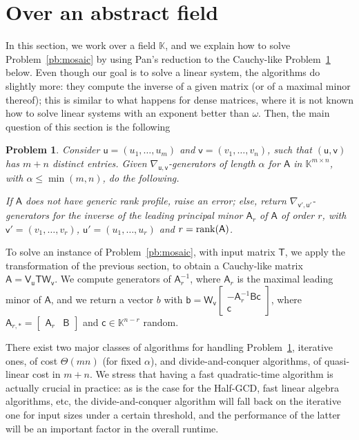 \documentclass[sigconf]{acmart}
\newcommand{\vb}{\ensuremath{\mathsf{b}}}
\newcommand{\vc}{\ensuremath{\mathsf{c}}}
\newcommand{\vu}{\ensuremath{\mathsf{u}}}
\newcommand{\vv}{\ensuremath{\mathsf{v}}}
\newcommand{\mA}{\ensuremath{\mathsf{A}}}
\newcommand{\mB}{\ensuremath{\mathsf{B}}}
\newcommand{\mT}{\ensuremath{\mathsf{T}}}
\newcommand{\mV}{\ensuremath{\mathsf{V}}}
\newcommand{\mW}{\ensuremath{\mathsf{W}}}
\newcommand{\K}{\ensuremath{\mathbb{K}}}
\newtheorem{pbm}{Problem}
\theoremstyle{acmdefinition}
\begin{document}
\section{Over an abstract field}\label{sec:abstract}
%
In this section, we work over a field $\K$, and we explain how to
solve Problem~\ref{pb:mosaic} by using Pan's reduction to the
Cauchy-like Problem~\ref{pb:cauchy} below. Even though our goal is to
solve a linear system, the algorithms do slightly more: they compute
the inverse of a given matrix (or of a maximal minor thereof); this is
similar to what happens for dense matrices, where it is not known how
to solve linear systems with an exponent better than $\omega$.
Then, the main question of this section is the following 
%
%

\vspace{-10px}
\begin{pbm}\label{pb:cauchy}
  Consider $\vu=(u_1,\dots,u_m)$ and $\vv=(v_1,\dots,v_n)$,
  such that $(\vu,\vv)$ has $m+n$ distinct entries. Given
  $\nabla_{\vu,\vv}$-generators of length $\alpha$ for $\mA$
  in $\K^{m \times n}$, with $\alpha \le \min(m,n)$, do the following.

  If $\mA$ does not have generic rank profile, raise an error;
  else, return $\nabla_{\vv',\vu'}$-generators for the inverse
    of the leading principal minor $\mA_r$ of $\mA$ of order $r$, with
    $\vv'=(v_1,\dots,v_r)$, $\vu'=(u_1,\dots,u_r)$ and
    $r={\rm rank}(\mA)$.
\end{pbm}

\vspace{-10px}
To solve an instance of Problem~\ref{pb:mosaic}, with input matrix
$\mT$, we apply the transformation of the previous section, to obtain
a Cauchy-like matrix $\mA = \mV_\vu \mT \mW_{\vv}$. We compute
generators of $\mA_{r}^{-1}$, where $\mA_r$ is the maximal leading minor
of $\mA$, and we return a vector $b$ with
$\vb=\mW_{\vv}
\left[\begin{smallmatrix} 
-\mA_r^{-1}  \mB \vc \\ 
\vc
\end{smallmatrix}\right]$,
where 
%
$\mA_{r,\ast}=\begin{bmatrix}
    \mA_r & \mB
  \end{bmatrix}$ 
and $\vc \in \K^{n-r}$ random.

There exist two major classes of algorithms for handling
Problem~\ref{pb:cauchy}, iterative ones, of cost  $\Theta(mn)$
(for fixed $\alpha$), and  divide-and-conquer
algorithms, of quasi-linear cost in $m+n$. We stress that having a
fast quadratic-time algorithm is actually crucial in practice: as is
the case for the Half-GCD, fast linear algebra algorithms, etc, the
divide-and-conquer  algorithm will fall back on the iterative one for input
sizes under a certain threshold, and the performance of the latter
will be an important factor in the overall runtime.
\end{document}
